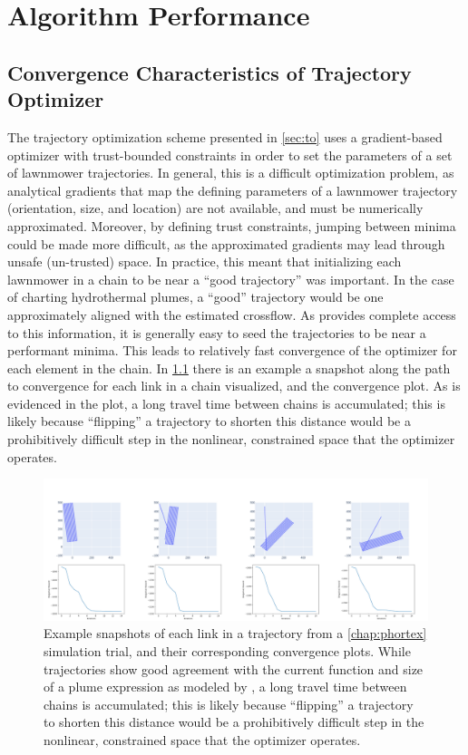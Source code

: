 \chapter{\PHORTEX Algorithm Performance}
\label{app:phortex}

\section{Convergence Characteristics of Trajectory Optimizer}
The trajectory optimization scheme presented in \cref{sec:to} uses a gradient-based optimizer with trust-bounded constraints in order to set the parameters of a set of lawnmower trajectories. In general, this is a difficult optimization problem, as analytical gradients that map the defining parameters of a lawnmower trajectory (orientation, size, and location) are not available, and must be numerically approximated. Moreover, by defining trust constraints, jumping between minima could be made more difficult, as the approximated gradients may lead through unsafe (un-trusted) space. In practice, this meant that initializing each lawnmower in a chain to be near a ``good trajectory'' was important. In the case of charting hydrothermal plumes, a ``good'' trajectory would be one approximately aligned with the estimated crossflow. As \PHUMES provides complete access to this information, it is generally easy to seed the trajectories to be near a performant minima. This leads to relatively fast convergence of the optimizer for each element in the chain. In \cref{fig:phortex_chain} there is an example a snapshot along the path to convergence for each link in a chain visualized, and the convergence plot. As is evidenced in the plot, a long travel time between chains is accumulated; this is likely because ``flipping'' a trajectory to shorten this distance would be a prohibitively difficult step in the nonlinear, constrained space that the optimizer operates.

\begin{figure}[h!]
    \centering
    \includegraphics[width=1\columnwidth]{figures/phortex_iterations.png}
    \caption[\PHORTEX optimization performance]{Example snapshots of each link in a \PHORTEX trajectory from a \cref{chap:phortex} simulation trial, and their corresponding convergence plots. While trajectories show good agreement with the current function and size of a plume expression as modeled by \PHUMES, a long travel time between chains is accumulated; this is likely because ``flipping'' a trajectory to shorten this distance would be a prohibitively difficult step in the nonlinear, constrained space that the optimizer operates.}
    \label{fig:phortex_chain}
\end{figure}

